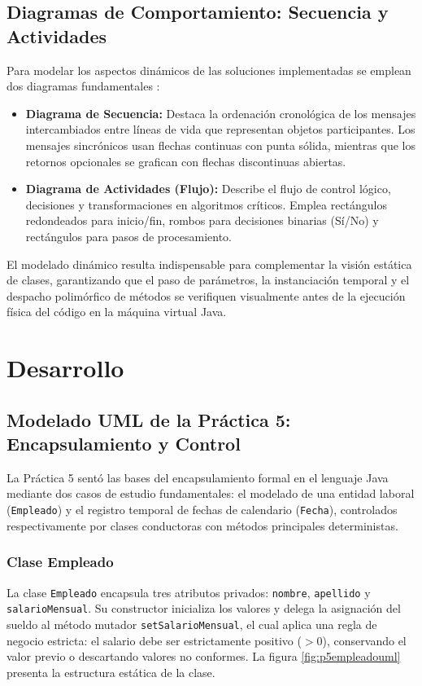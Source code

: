\documentclass[letterpaper,12pt,oneside]{article}
\numberwithin{figure}{section}
\begin{document}
\subsection{Diagramas de Comportamiento: Secuencia y Actividades}
Para modelar los aspectos din\'amicos de las soluciones implementadas se emplean dos diagramas fundamentales \cite{gamma1994}:
\begin{itemize}
    \item \textbf{Diagrama de Secuencia:} Destaca la ordenaci\'on cronol\'ogica de los mensajes intercambiados entre l\'ineas de vida que representan objetos participantes. Los mensajes sincr\'onicos usan flechas continuas con punta s\'olida, mientras que los retornos opcionales se grafican con flechas discontinuas abiertas.
    \item \textbf{Diagrama de Actividades (Flujo):} Describe el flujo de control l\'ogico, decisiones y transformaciones en algoritmos cr\'iticos. Emplea rect\'angulos redondeados para inicio/fin, rombos para decisiones binarias (S\'i/No) y rect\'angulos para pasos de procesamiento.
\end{itemize}

El modelado din\'amico resulta indispensable para complementar la visi\'on est\'atica de clases, garantizando que el paso de par\'ametros, la instanciaci\'on temporal y el despacho polim\'orfico de m\'etodos se verifiquen visualmente antes de la ejecuci\'on f\'isica del c\'odigo en la m\'aquina virtual Java.


\section{Desarrollo}

\subsection{Modelado UML de la Pr\'actica 5: Encapsulamiento y Control}
La Pr\'actica 5 sent\'o las bases del encapsulamiento formal en el lenguaje Java mediante dos casos de estudio fundamentales: el modelado de una entidad laboral (\texttt{Empleado}) y el registro temporal de fechas de calendario (\texttt{Fecha}), controlados respectivamente por clases conductoras con m\'etodos principales deterministas.

\subsubsection{Clase Empleado}
La clase \texttt{Empleado} encapsula tres atributos privados: \texttt{nombre}, \texttt{apellido} y \texttt{salarioMensual}. Su constructor inicializa los valores y delega la asignaci\'on del sueldo al m\'etodo mutador \texttt{setSalarioMensual}, el cual aplica una regla de negocio estricta: el salario debe ser estrictamente positivo ($>0$), conservando el valor previo o descartando valores no conformes. La figura \ref{fig:p5empleadouml} presenta la estructura est\'atica de la clase.
\end{document}
